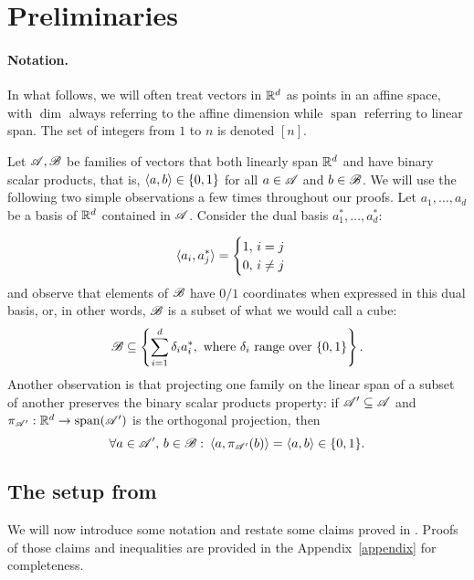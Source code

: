 \section{Preliminaries}\label{secStability}
\paragraph{Notation.}
In what follows, we will often treat vectors in ${\mathbb{R}}^d$ as points in an affine space, with $\operatorname{dim}$ always referring to the affine dimension while $\operatorname{span}$ referring to linear span. The set of integers  from $1$ to $n$ is denoted $[n]$. 

Let ${\mathscr{A}}, {\mathscr{B}}$ be families of vectors that both linearly span ${\mathbb{R}}^d$ and have binary scalar products, that is, $\langle a, b \rangle \in \{0,1\}$ for all $a \in {\mathscr{A}}$ and $b \in {\mathscr{B}}$. We will use the following two simple observations a few times throughout our proofs. Let $a_1, \ldots, a_d$ be a basis of ${\mathbb{R}}^d$ contained in ${\mathscr{A}}$. Consider the dual basis $a_1^*, \ldots, a_d^*$:

\[
    \langle a_i, a_j^* \rangle = 
    \begin{cases}
        1,\, i = j \\
        0,\, i\neq j
    \end{cases}
\]
and observe that elements of ${\mathscr{B}}$ have $0/1$ coordinates when expressed in this dual basis, or, in other words, ${\mathscr{B}}$ is a subset of what we would call a cube: 
\[
    {\mathscr{B}} \subseteq \left\{\sum_{i=1}^d \delta_i a_i^*, \text{ where } \delta_i \text{ range over } \{0, 1\}\right\}.
\]
Another observation is that projecting one family on the linear span of a subset of another preserves the binary scalar products property: if ${\mathscr{A}}' \subseteq {\mathscr{A}}$ and $\pi_{{\mathscr{A}}'}: {\mathbb{R}}^d \rightarrow \operatorname{span}({\mathscr{A}}')$ is the orthogonal projection, then
\[
    \forall a \in {\mathscr{A}}',\, b \in {\mathscr{B}}:\: \langle a, \pi_{{\mathscr{A}}'}(b) \rangle = \langle a, b \rangle \in \{0,1\}. 
\]

\subsection{The setup from \cite{kupavskii22}}\label{secstability2} We will now introduce some notation and restate some claims proved in \cite{kupavskii22}. Proofs of those claims and inequalities are provided in the Appendix~\ref{appendix} for completeness.

